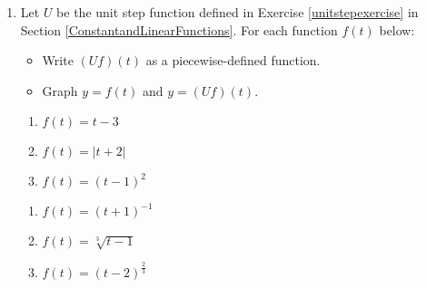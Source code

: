 \documentclass{ximera}
\begin{document}
\begin{enumerate}
\setcounter{enumi}{\value{HW}}

\item  Let $U$ be the unit step function defined in Exercise \ref{unitstepexercise} in Section \ref{ConstantandLinearFunctions}.  For each function $f(t)$ below:

\begin{itemize}

\item  Write $(Uf)(t)$ as a piecewise-defined function.

\item  Graph $y = f(t)$ and $y = (Uf)(t)$.

\end{itemize}


\begin{enumerate}

\item $f(t) = t-3$



\item  $f(t) = |t+2|$



\item  $f(t) =(t-1)^2$



\setcounter{HW}{\value{enumii}}

\end{enumerate}



\begin{enumerate}

\setcounter{enumii}{\value{HW}}

\item  $f(t) =(t+1)^{-1}$



\item  $f(t) = \sqrt[3]{t-1}$ 



\item  $f(t) = (t-2)^{\frac{2}{3}}$ 



\setcounter{HW}{\value{enumii}}


\end{enumerate}
\end{enumerate}
\end{document}
